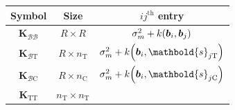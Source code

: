 \documentclass[letter]{article}
\DeclarePairedDelimiter{\parenthesis}{\lparen}{\rparen}
\newcommand{\del}[1]{\parenthesis*{#1}}
\newcommand{\treat}{\mathrm{T}}
\newcommand{\ctrol}{\mathrm{C}}
\newcommand{\svec}{\mathbold{s}}
\newcommand{\border}{\mathcal{B}}
\newcommand{\sentinel}{\bm{b}}
\newcommand{\numsent}{R}
\newcommand{\Kmat}{\mathbold{K}}
\newcommand{\KBB}{\Kmat_{\border \border}}
\newcommand{\KBT}{\Kmat_{\border \treat}}
\newcommand{\KBC}{\Kmat_{\border \ctrol}}
\newcommand{\KTT}{\Kmat_{\treat \treat}}
\begin{document}
\begin{longtable}[]{@{}ccc@{}}
\toprule
\begin{minipage}[b]{0.24\columnwidth}\centering
Symbol\strut
\end{minipage} & \begin{minipage}[b]{0.30\columnwidth}\centering
Size\strut
\end{minipage} & \begin{minipage}[b]{0.37\columnwidth}\centering
\(ij^{\mathrm{th}}\) entry\strut
\end{minipage}\tabularnewline
\midrule
\endhead
\begin{minipage}[t]{0.24\columnwidth}\centering
\(\KBB\)\strut
\end{minipage} & \begin{minipage}[t]{0.30\columnwidth}\centering
\(\numsent \times \numsent\)\strut
\end{minipage} & \begin{minipage}[t]{0.37\columnwidth}\centering
\(\sigma_m^2 + k\del{\sentinel_i,\sentinel_j}\)\strut
\end{minipage}\tabularnewline
\begin{minipage}[t]{0.24\columnwidth}\centering
\(\KBT\)\strut
\end{minipage} & \begin{minipage}[t]{0.30\columnwidth}\centering
\(\numsent \times n_\treat\)\strut
\end{minipage} & \begin{minipage}[t]{0.37\columnwidth}\centering
\(\sigma_m^2 + k\del{\sentinel_i,\svec_{j\treat}}\)\strut
\end{minipage}\tabularnewline
\begin{minipage}[t]{0.24\columnwidth}\centering
\(\KBC\)\strut
\end{minipage} & \begin{minipage}[t]{0.30\columnwidth}\centering
\(\numsent \times n_\ctrol\)\strut
\end{minipage} & \begin{minipage}[t]{0.37\columnwidth}\centering
\(\sigma_m^2 + k\del{\sentinel_i,\svec_{j\ctrol}}\)\strut
\end{minipage}\tabularnewline
\begin{minipage}[t]{0.24\columnwidth}\centering
\(\KTT\)\strut
\end{minipage} & \begin{minipage}[t]{0.30\columnwidth}\centering
\(n_\treat \times n_\treat\)\strut
\end{minipage} & \begin{minipage}[t]{0.37\columnwidth}\centering

\end{minipage}
\end{longtable}
\end{document}
